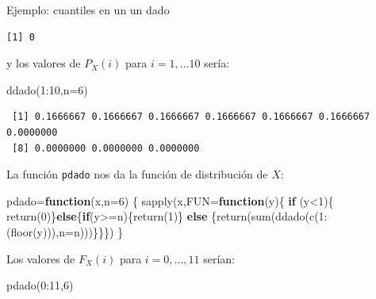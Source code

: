 \documentclass[
  letterpaper,
  DIV=11,
  numbers=noendperiod]{scrreprt}
\newenvironment{Shaded}{\begin{snugshade}}{\end{snugshade}}
\newcommand{\AttributeTok}[1]{\textcolor[rgb]{0.40,0.45,0.13}{#1}}
\newcommand{\ControlFlowTok}[1]{\textcolor[rgb]{0.00,0.23,0.31}{\textbf{#1}}}
\newcommand{\DecValTok}[1]{\textcolor[rgb]{0.68,0.00,0.00}{#1}}
\newcommand{\FunctionTok}[1]{\textcolor[rgb]{0.28,0.35,0.67}{#1}}
\newcommand{\NormalTok}[1]{\textcolor[rgb]{0.00,0.23,0.31}{#1}}
\newcommand{\OtherTok}[1]{\textcolor[rgb]{0.00,0.23,0.31}{#1}}
\newcommand{\SpecialCharTok}[1]{\textcolor[rgb]{0.37,0.37,0.37}{#1}}
\begin{document}
\begin{Ejemplo}{Ejemplo: cuantiles en un un dado}{}
\begin{verbatim}
[1] 0
\end{verbatim}

y los valores de \(P_X(i)\) para \(i=1,\ldots 10\) sería:

\begin{Shaded}
\begin{Highlighting}[]
\FunctionTok{ddado}\NormalTok{(}\DecValTok{1}\SpecialCharTok{:}\DecValTok{10}\NormalTok{,}\AttributeTok{n=}\DecValTok{6}\NormalTok{)}
\end{Highlighting}
\end{Shaded}

\begin{verbatim}
 [1] 0.1666667 0.1666667 0.1666667 0.1666667 0.1666667 0.1666667 0.0000000
 [8] 0.0000000 0.0000000 0.0000000
\end{verbatim}

La función \texttt{pdado} nos da la función de distribución de \(X\):

\begin{Shaded}
\begin{Highlighting}[]
\NormalTok{pdado}\OtherTok{=}\ControlFlowTok{function}\NormalTok{(x,}\AttributeTok{n=}\DecValTok{6}\NormalTok{) }
\NormalTok{  \{}
  \FunctionTok{sapply}\NormalTok{(x,}\AttributeTok{FUN=}\ControlFlowTok{function}\NormalTok{(y)\{ }\ControlFlowTok{if}\NormalTok{ (y}\SpecialCharTok{\textless{}}\DecValTok{1}\NormalTok{)\{ }\FunctionTok{return}\NormalTok{(}\DecValTok{0}\NormalTok{)\}}\ControlFlowTok{else}\NormalTok{\{}\ControlFlowTok{if}\NormalTok{(y}\SpecialCharTok{\textgreater{}=}\NormalTok{n)\{}\FunctionTok{return}\NormalTok{(}\DecValTok{1}\NormalTok{)\} }\ControlFlowTok{else}
\NormalTok{  \{}\FunctionTok{return}\NormalTok{(}\FunctionTok{sum}\NormalTok{(}\FunctionTok{ddado}\NormalTok{(}\FunctionTok{c}\NormalTok{(}\DecValTok{1}\SpecialCharTok{:}\NormalTok{(}\FunctionTok{floor}\NormalTok{(y))),}\AttributeTok{n=}\NormalTok{n)))\}\}\})}
\NormalTok{  \}}
\end{Highlighting}
\end{Shaded}

Los valores de \(F_X(i)\) para \(i=0,\ldots, 11\) serían:

\begin{Shaded}
\begin{Highlighting}[]
\FunctionTok{pdado}\NormalTok{(}\DecValTok{0}\SpecialCharTok{:}\DecValTok{11}\NormalTok{,}\DecValTok{6}\NormalTok{)}
\end{Highlighting}
\end{Shaded}


\end{Ejemplo}
\end{document}
